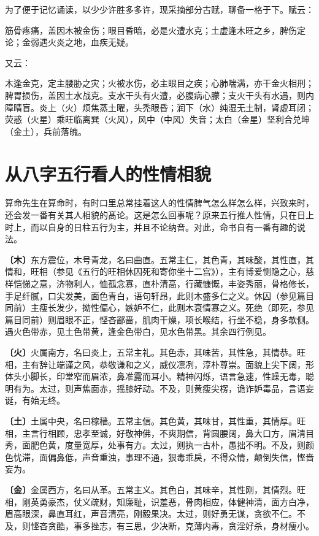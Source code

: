 \documentclass[a5paper,oneside,12pt]{ctexbook}
\newenvironment{yinyong}{%
    \begin{list}{}{\parsep\parskip
        \setlength\topsep{0pt}
        \setlength\itemindent{2em}%
        \setlength\parindent{2em}
        \setlength\listparindent{2em}
        \setlength{\leftmargin}{2em}
        \setlength{\rightmargin}{2em}
        \kaishu
    }
    \item[]
}{
  \end{list}
}
\begin{document}
为了便于记忆诵读，以少少许胜多多许，现采摘部分古赋，聊备一格于下。赋云：
\begin{yinyong}
筋骨疼痛，盖因木被金伤；眼目昏暗，必是火遭水克；土虚逢木旺之乡，脾伤定论；金弱遇火炎之地，血疾无疑。
\end{yinyong}
又云：
\begin{yinyong}
木逢金克，定主腰胁之灾；火被水伤，必主眼目之疾；心肺喘满，亦干金火相刑；脾胃损伤，盖因土水战克。支水干头有火遭，必腹病心朦；支火干头有水遇，则内障晴盲。炎上（火）烦焦蒸土曜，头禿眼昏；润下（水）纯湿无土制，肾虚耳闭；荧惑（火星）乘旺临离巽（火风），风中（中风）失音；太白（金星）坚利合兑坤（金土），兵前落魄。
\end{yinyong}

\section{从八字五行看人的性情相貌}

算命先生在算命时，有时口里总常挂着这人的性情脾气怎么样怎么样，兴致来时，还会发一番有关其人相貌的髙论。这是怎么回事呢？原来五行推人性情，只在日上时上，而以自身的日柱五行为主，并且不论纳音。对此，命书自有一番有趣的说法。

\textbf{〔木〕}东方震位，木号青龙，名曰曲直。五常主仁，其色青，其味酸，其性直，其情和，旺相（参见《五行的旺相休囚死和寄你坐十二宫》），主有博爱恻隐之心，慈样恺悌之意，济物利人，恤孤念寡，直朴清高，行藏慷慨，丰姿秀丽，骨格修长，手足纤腻，口尖发美，面色青白，语句轩昂，此则木盛多仁之义。休囚（参见篇目同前）主瘦长发少，拗性偏心，嫉妒不仁，此则木衰情寡之义。死绝（即死，参见篇目同前）则眉眼不正，悭吝鄙啬，肌肉干燥，项长喉结，行坐不稳，身多欹侧。遇火色带赤，见土色带黄，逢金色带白，见水色带黑。其余四行例见。

\textbf{〔火〕}火属南方，名曰炎上，五常主礼。其色赤，其味苦，其性急，其情恭。旺相，主有辞让端谨之风，恭敬谦和之义，威仪凛冽，淳朴尊崇。面貌上尖下阔，形体头小脚长，印堂窄而眉浓，鼻准露而耳小。精神闪烁，语言急速，性躁无毒，聪明有为。太过，则声焦面赤，摇膝好动。不及，则黄瘦尖楞，诡诈妒毒品，言语妄诞，有始无终。

\textbf{〔土〕}土属中央，名曰稼穑。五常主信。其色黄，其味甘，其性重，其情厚。旺相，主言行相顾，忠孝至诚，好敬神佛，不爽期信，背圆腰阔，鼻大口方，眉清目秀，面肥色黄，度量宽厚，处事有方。太过，则执一古朴，愚拙不明。不及，则颜色忧滞，面偏鼻低，声音重浊，事理不通，狠毒乖戾，不得众情，颠倒失信，悭啬妄为。

\textbf{〔金〕}金属西方，名曰从革。五常主义。其色白，其味辛，其性刚，其情烈。旺相，刚英勇豪杰，仗义疏财，知廉耻，识羞恶，骨肉相应，体健神清，面方白净，眉高眼深，鼻直耳红，声音清亮，刚毅果决。太过，则好勇无谋，贪欲不仁。不及，则悭吝贪酷，事多挫志，有三思，少决断，克薄内毒，贪淫好杀，身材瘦小。
\end{document}
